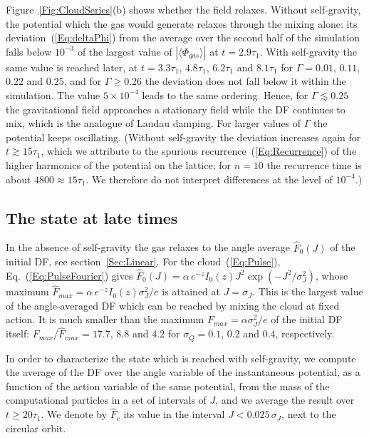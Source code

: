 Figure~\ref{Fig:CloudSeries}(b) shows whether the field relaxes. Without self-gravity, the potential which the gas would generate relaxes through the mixing alone: its deviation~(\ref{Eq:deltaPhi}) from the average over the second half of the simulation falls below $10^{-3}$ of the largest value of $|\langle\Phi_{gas}\rangle|$ at $t = 2.9\tau_1$. With self-gravity the same value is reached later, at $t = 3.3\tau_1$, $4.8\tau_1$, $6.2\tau_1$ and $8.1\tau_1$ for $\Gamma = 0.01$, $0.11$, $0.22$ and $0.25$, and for $\Gamma\geq 0.26$ the deviation does not fall below it within the simulation. The value $5\times 10^{-4}$ leads to the same ordering. Hence, for $\Gamma\lesssim 0.25$ the gravitational field approaches a stationary field while the DF continues to mix, which is the analogue of Landau damping. For larger values of $\Gamma$ the potential keeps oscillating. (Without self-gravity the deviation increases again for $t\gtrsim 15\tau_1$, which we attribute to the spurious recurrence~(\ref{Eq:Recurrence}) of the higher harmonics of the potential on the lattice; for $n = 10$ the recurrence time is about $4800\approx 15\tau_1$. We therefore do not interpret differences at the level of $10^{-4}$.)


\subsection{The state at late times}
\label{SubSec:FarLate}
\label{SubSec:FarCore}

In the absence of self-gravity the gas relaxes to the angle average $\hat{F}_0(J)$ of the initial DF, see section~\ref{Sec:Linear}. For the cloud~(\ref{Eq:Pulse}), Eq.~(\ref{Eq:PulseFourier}) gives $\hat{F}_0(J) = \alpha\, e^{-z} I_0(z) J^2\exp(-J^2/\sigma_J^2)$, whose maximum $\hat{F}_{max} = \alpha\, e^{-z} I_0(z)\sigma_J^2/e$ is attained at $J = \sigma_J$. This is the largest value of the angle-averaged DF which can be reached by mixing the cloud at fixed action. It is much smaller than the maximum $F_{max} = \alpha\sigma_J^2/e$ of the initial DF itself: $F_{max}/\hat{F}_{max} = 17.7$, $8.8$ and $4.2$ for $\sigma_Q = 0.1$, $0.2$ and $0.4$, respectively.

In order to characterize the state which is reached with self-gravity, we compute the average of the DF over the angle variable of the instantaneous potential, as a function of the action variable of the same potential, from the mass of the computational particles in a set of intervals of $J$, and we average the result over $t\geq 20\tau_1$. We denote by $\hat{F}_c$ its value in the interval $J < 0.025\,\sigma_J$, next to the circular orbit.

